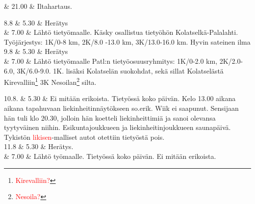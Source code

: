\documentclass[11pt,a5paper,oneside]{book}
\begin{document}
& 21.00 & Iltahartaus. \\

\taulustop


8.8 & 5.30 & Herätys \\

& 7.00 & Lähtö tietyömaalle. \newline Käsky osallistua tietyöhön Kolatselkä-Palalahti. \newline Työjärjestys: 1K/0-8 km, 2K/8.0 -13.0 km, 3K/13.0-16.0 km. \newline Hyvin sateinen ilma \newline\newline\newline\newline\newline\newline \\

9.8 & 5.30 & Herätys \\

& 7.00 & Lähtö tietyömaalle \newline Patl:n tietyöosuusryhmitys: \newline 1K/0-2.0 km, 2K/2.0-6.0, 3K/6.0-9.0. 1K. lisäksi Kolatselän suokohdat, sekä sillat Kolatselästä Kirevalliin\footnote{\textcolor{red}{Kirevalliin?}} 3K Nesoilan\footnote{\textcolor{red}{Nesoila?}} silta. \\
\newpage

10.8. & 5.30 & Ei mitään erikoista. Tietyössä koko päivän. \newline Kelo 13.00 aikana aikana tapahuvaan liekinheitinnäytökseen so.erik. Wiik ei saapunut. \newline Sensijaan hän tuli klo 20.30, jolloin hän koetteli liekinheittimiä ja sanoi olevansa tyytyväinen niihin. \newline Esikuntajoukkueen ja liekinheitinjoukkueen saunapäivä. \newline Tykistön \textcolor{red}{likisen}-malliset autot otettiin tietyöstä pois. \newline\newline\newline\newline \\

11.8 & 5.30 & Herätys. \\

& 7.00 & Lähtö työmaalle. \newline Tietyössä koko päivän. \newline Ei mitään erikoista. \\

\taulustop

\end{document}
